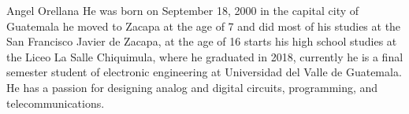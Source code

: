 \begin{IEEEbiography}{Angel Orellana}
He was born on September 18, 2000 in the capital city of Guatemala
he moved to Zacapa at the age of 7 and did most of his studies at the
San Francisco Javier de Zacapa, at the age of 16 starts his high school studies at the
Liceo La Salle Chiquimula, where he graduated in 2018, currently
he is a final semester student of 
electronic engineering at Universidad del Valle 
de Guatemala. He has a passion for designing analog and digital circuits, 
programming, and telecommunications.
\end{IEEEbiography}
    

